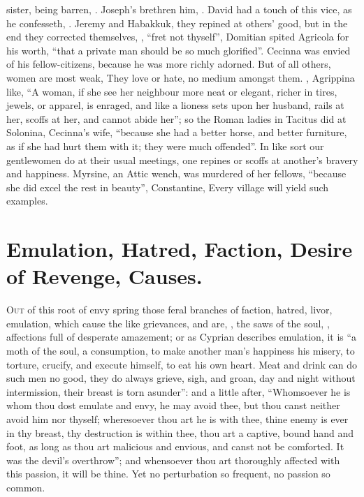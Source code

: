 sister, being barren, . Joseph's brethren him, . David had a touch of this vice, as he confesseth,
. Jeremy and
Habakkuk, they repined at others' good, but in the end
they corrected themselves, , \enquote{fret not thyself}, \etc{}
Domitian spited Agricola for his worth, \enquote{that a private
man should be so much glorified}. Cecinna was envied of
his fellow-citizens, because he was more richly adorned. But of all others,
women are most weak,  They
love or hate, no medium amongst them. , Agrippina like, \enquote{A woman, if she see her
neighbour more neat or elegant, richer in tires, jewels, or apparel, is
enraged, and like a lioness sets upon her husband, rails at her, scoffs at her,
and cannot abide her}; so the Roman ladies in Tacitus did at Solonina,
Cecinna's wife, \enquote{because she had a better horse, and
better furniture, as if she had hurt them with it; they were much offended}. In
like sort our gentlewomen do at their usual meetings, one repines or scoffs at
another's bravery and happiness. Myrsine, an Attic wench, was murdered of her
fellows, \enquote{because she did excel the rest in beauty},
Constantine,  Every village will
yield such examples.

\section{Emulation, Hatred, Faction, Desire of Revenge, Causes.}

\lettrine{O}{ut} of this root of envy spring those feral
branches of faction, hatred, livor, emulation, which cause the like grievances,
and are, , the saws of the soul,
, affections full of
desperate amazement; or as Cyprian describes emulation, it is
\enquote{a moth of the soul, a consumption, to make another man's
happiness his misery, to torture, crucify, and execute himself, to eat his own
heart. Meat and drink can do such men no good, they do always grieve, sigh, and
groan, day and night without intermission, their breast is torn asunder}: and a
little after, \enquote{Whomsoever he is whom thou dost emulate and
envy, he may avoid thee, but thou canst neither avoid him nor thyself;
wheresoever thou art he is with thee, thine enemy is ever in thy breast, thy
destruction is within thee, thou art a captive, bound hand and foot, as long as
thou art malicious and envious, and canst not be comforted. It was the devil's
overthrow}; and whensoever thou art thoroughly affected with this passion, it
will be thine. Yet no perturbation so frequent, no passion so common.


